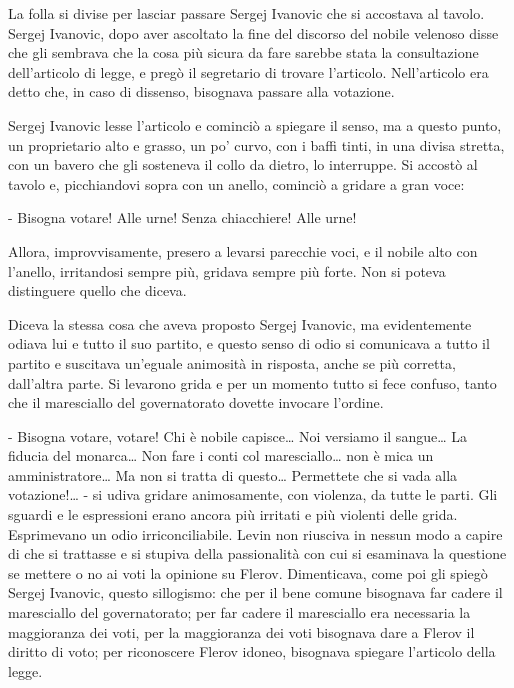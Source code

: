 La folla si divise per lasciar passare Sergej Ivanovic che si accostava al tavolo. Sergej Ivanovic, dopo aver ascoltato la fine del discorso del nobile velenoso disse che gli sembrava che la cosa più sicura da fare sarebbe stata la consultazione dell'articolo di legge, e pregò il segretario di trovare l'articolo. Nell'articolo era detto che, in caso di dissenso, bisognava passare alla votazione. 

Sergej Ivanovic lesse l'articolo e cominciò a spiegare il senso, ma a questo punto, un proprietario alto e grasso, un po' curvo, con i baffi tinti, in una divisa stretta, con un bavero che gli sosteneva il collo da dietro, lo interruppe. Si accostò al tavolo e, picchiandovi sopra con un anello, cominciò a gridare a gran voce: 

- Bisogna votare! Alle urne! Senza chiacchiere! Alle urne! 

Allora, improvvisamente, presero a levarsi parecchie voci, e il nobile alto con l'anello, irritandosi sempre più, gridava sempre più forte. Non si poteva distinguere quello che diceva. 

Diceva la stessa cosa che aveva proposto Sergej Ivanovic, ma evidentemente odiava lui e tutto il suo partito, e questo senso di odio si comunicava a tutto il partito e suscitava un'eguale animosità in risposta, anche se più corretta, dall'altra parte. Si levarono grida e per un momento tutto si fece confuso, tanto che il maresciallo del governatorato dovette invocare l'ordine. 

- Bisogna votare, votare! Chi è nobile capisce\ldots{} Noi versiamo il sangue\ldots{} La fiducia del monarca\ldots{} Non fare i conti col maresciallo\ldots{} non è mica un amministratore\ldots{} Ma non si tratta di questo\ldots{} Permettete che si vada alla votazione!\ldots{} - si udiva gridare animosamente, con violenza, da tutte le parti. Gli sguardi e le espressioni erano ancora più irritati e più violenti delle grida. Esprimevano un odio irriconciliabile. Levin non riusciva in nessun modo a capire di che si trattasse e si stupiva della passionalità con cui si esaminava la questione se mettere o no ai voti la opinione su Flerov. Dimenticava, come poi gli spiegò Sergej Ivanovic, questo sillogismo: che per il bene comune bisognava far cadere il maresciallo del governatorato; per far cadere il maresciallo era necessaria la maggioranza dei voti, per la maggioranza dei voti bisognava dare a Flerov il diritto di voto; per riconoscere Flerov idoneo, bisognava spiegare l'articolo della legge. 

